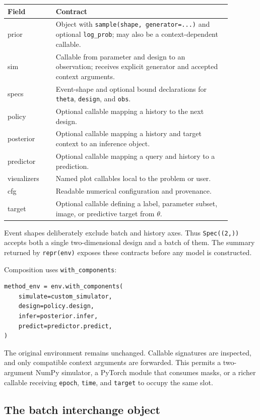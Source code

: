 \documentclass[11pt]{article}
\begin{document}
\begin{center}
\begin{tabular}{>{\ttfamily}p{0.19\linewidth}p{0.69\linewidth}}
\toprule
Field & Contract \\
\midrule
prior & Object with \texttt{sample(shape, generator=...)} and optional
\texttt{log\_prob}; may also be a context-dependent callable. \\
sim & Callable from parameter and design to an observation; receives explicit
generator and accepted context arguments. \\
specs & Event-shape and optional bound declarations for \texttt{theta},
\texttt{design}, and \texttt{obs}. \\
policy & Optional callable mapping a history to the next design. \\
posterior & Optional callable mapping a history and target context to an inference
object. \\
predictor & Optional callable mapping a query and history to a prediction. \\
visualizers & Named plot callables local to the problem or user. \\
cfg & Readable numerical configuration and provenance. \\
target & Optional callable defining a label, parameter subset, image, or predictive
target from $\theta$. \\
\bottomrule
\end{tabular}
\end{center}

Event shapes deliberately exclude batch and history axes. Thus
\texttt{Spec((2,))} accepts both a single two-dimensional design and a batch of them.
The summary returned by \texttt{repr(env)} exposes these contracts before any model is
constructed.

Composition uses \texttt{with\_components}:
\begin{lstlisting}
method_env = env.with_components(
    simulate=custom_simulator,
    design=policy.design,
    infer=posterior.infer,
    predict=predictor.predict,
)
\end{lstlisting}
The original environment remains unchanged. Callable signatures are inspected, and
only compatible context arguments are forwarded. This permits a two-argument NumPy
simulator, a PyTorch module that consumes masks, or a richer callable receiving
\texttt{epoch}, \texttt{time}, and \texttt{target} to occupy the same slot.

\subsection{The batch interchange object}
\end{document}
